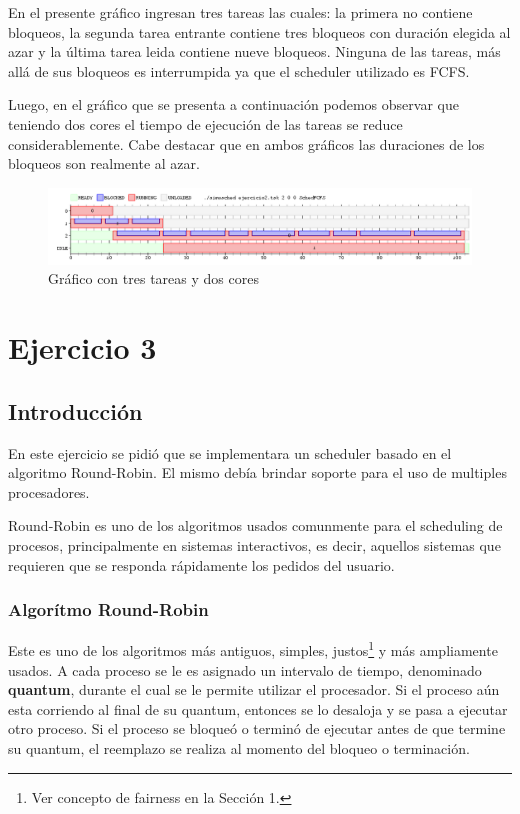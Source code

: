 \documentclass[a4paper,11pt]{article}
\begin{document}
En el presente gráfico ingresan tres tareas las cuales: la primera no contiene bloqueos, la segunda tarea entrante contiene tres bloqueos con duración elegida al azar y la última tarea leida contiene nueve bloqueos. Ninguna de las tareas, más allá de sus bloqueos es interrumpida ya que el scheduler utilizado es FCFS. 

Luego, en el gráfico que se presenta a continuación podemos observar que teniendo dos cores el tiempo de ejecución de las tareas se reduce considerablemente. Cabe destacar que en ambos gráficos las duraciones de los bloqueos son realmente al azar. 

\begin{figure}[H]
\centering
\includegraphics[scale=.6, width=1\textwidth]{graficos/ej2-2core}
\caption{Gráfico con tres tareas y dos cores}
\end{figure}


\pagebreak

\section{Ejercicio 3}
	\subsection{Introducción}
		En este ejercicio se pidió que se implementara un scheduler basado en el algoritmo Round-Robin. El mismo debía brindar soporte para el uso de multiples procesadores.
		
		Round-Robin es uno de los algoritmos usados comunmente para el scheduling de procesos, principalmente en sistemas interactivos, es decir, aquellos sistemas que requieren que se responda rápidamente los pedidos del usuario. 

	\subsubsection*{Algorítmo Round-Robin}
		Este es uno de los algoritmos más antiguos, simples, justos\footnote{Ver concepto de fairness en la Sección 1.} y más ampliamente usados. A cada proceso se le es asignado un intervalo de tiempo, denominado \textbf{quantum}, durante el cual se le permite utilizar el procesador. Si el proceso aún esta corriendo al final de su quantum, entonces se lo desaloja y se pasa a ejecutar otro proceso. Si el proceso se bloqueó o terminó de ejecutar antes de que termine su quantum, el reemplazo se realiza al momento del bloqueo o terminación. 
	
\end{document}

